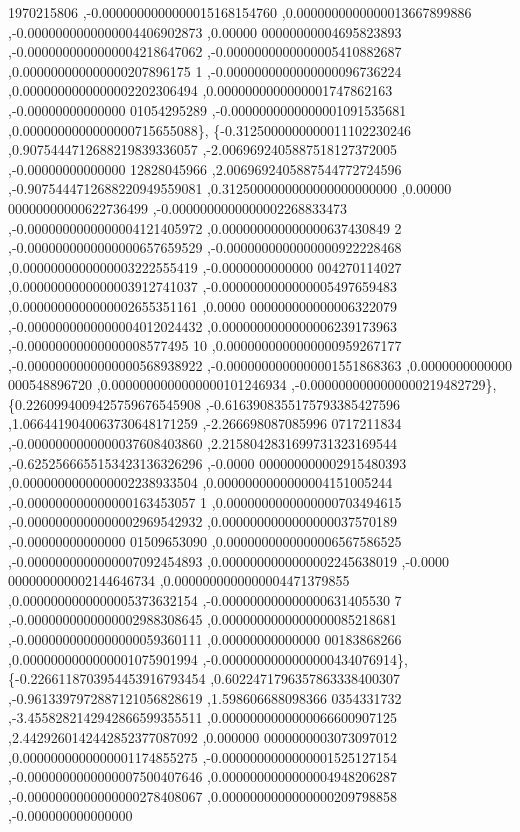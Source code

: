 \begin{DoxyCode}
      1970215806 ,-0.0000000000000015168154760 ,0.0000000000000013667899886 ,-0.0000000000000004406902873 ,0.00000
      00000000004695823893 ,-0.0000000000000004218647062 ,-0.0000000000000005410882687 ,0.000000000000000207896175
      1 ,-0.0000000000000000096736224 ,0.0000000000000002202306494 ,0.0000000000000001747862163 ,-0.00000000000000
      01054295289 ,-0.0000000000000001091535681 ,0.0000000000000000715655088\},
\{-0.3125000000000011102230246 ,0.9075444712688219839336057 ,-2.0069692405887518127372005 ,-0.00000000000000
      12828045966 ,2.0069692405887544772724596 ,-0.9075444712688220949559081 ,0.3125000000000000000000000 ,0.00000
      00000000000622736499 ,-0.0000000000000002268833473 ,-0.0000000000000004121405972 ,0.000000000000000637430849
      2 ,-0.0000000000000000657659529 ,-0.0000000000000000922228468 ,0.0000000000000003222555419 ,-0.0000000000000
      004270114027 ,0.0000000000000003912741037 ,-0.0000000000000005497659483 ,0.0000000000000002655351161 ,0.0000
      000000000000006322079 ,-0.0000000000000004012024432 ,0.0000000000000006239173963 ,-0.00000000000000008577495
      10 ,0.0000000000000000959267177 ,-0.0000000000000000568938922 ,-0.0000000000000001551868363 ,0.0000000000000
      000548896720 ,0.0000000000000000101246934 ,-0.0000000000000000219482729\},
\{0.2260994009425759676545908 ,-0.6163908355175793385427596 ,1.0664419040063730648171259 ,-2.266698087085996
      0717211834 ,-0.0000000000000037608403860 ,2.2158042831699731323169544 ,-0.6252566655153423136326296 ,-0.0000
      000000000002915480393 ,0.0000000000000002238933504 ,0.0000000000000004151005244 ,-0.000000000000000163453057
      1 ,0.0000000000000000703494615 ,-0.0000000000000002969542932 ,0.0000000000000000037570189 ,-0.00000000000000
      01509653090 ,0.0000000000000006567586525 ,-0.0000000000000007092454893 ,0.0000000000000002245638019 ,-0.0000
      000000000002144646734 ,0.0000000000000004471379855 ,0.0000000000000005373632154 ,-0.000000000000000631405530
      7 ,-0.0000000000000002988308645 ,0.0000000000000000085218681 ,-0.0000000000000000059360111 ,0.00000000000000
      00183868266 ,0.0000000000000001075901994 ,-0.0000000000000000434076914\},
\{-0.2266118703954453916793454 ,0.6022471796357863338400307 ,-0.9613397972887121056828619 ,1.598606688098366
      0354331732 ,-3.4558282142942866599355511 ,0.0000000000000066600907125 ,2.4429260142442852377087092 ,0.000000
      0000000003073097012 ,0.0000000000000001174855275 ,-0.0000000000000001525127154 ,-0.0000000000000007500407646
       ,0.0000000000000004948206287 ,-0.0000000000000000278408067 ,0.0000000000000000209798858 ,-0.000000000000000

\end{DoxyCode}
